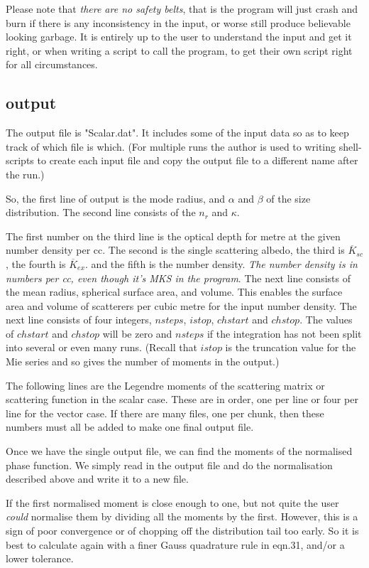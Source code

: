 \begin{flushleft}
Please note that {\it there are no safety belts}, that is the program will just
crash and burn if there is any inconsistency in the input, or worse still
 produce believable looking garbage. It is entirely up to the user to 
understand the input 
and get it right, or when writing a script to call the program, to get their own script
right for all circumstances.

\subsection{output}

The output file is "Scalar.dat". It includes some of the 
input data so as to keep track of which file is which. (For multiple
runs the author is used to writing shell-scripts to create each input file
and copy the output file to a different name after the run.)

So, the first line of output is the mode radius, and $\alpha$ and $\beta$ 
of the size distribution. The second line consists of the $n_r$ and $\kappa$.

The first number on the third line is the optical depth for metre at
the given number density per cc. The second is the single scattering albedo,
the third is ${\overline K_{sc}}$, the fourth is ${\overline K_{ex}}$.
and the fifth is the number density. {\it The number density is
 in numbers per cc, even though it's MKS in the program}.
The next line consists of the mean radius, spherical surface area, and volume.
This enables the surface area and volume of scatterers per cubic metre 
for the input number density.
The next line consists of four integers, $nsteps$, $istop$, $chstart$ and $chstop$.
The values of $chstart$ and $chstop$ will be zero and $nsteps$ if the integration
has not been split into several or even many runs. (Recall that $istop$ is the 
truncation value for the Mie series and so gives the number of moments in 
the output.)

The following lines are the Legendre moments of the scattering matrix
or scattering function in the scalar case.  These are in order, one per 
line or four per line for the vector case.
 If there are many files, one per chunk,
then these numbers must all be added to make one final output file.

Once we have the single output file, we can find the moments
of the normalised phase function. We simply read in the output file
and do the normalisation described above and write it to a new file.

If the first normalised moment is close enough to one, but not quite 
the user {\it could} normalise them by dividing all the moments by the first.
However, this is a sign of poor convergence or of chopping off the distribution
tail too early. So it is best to  calculate again with a finer Gauss quadrature 
rule in eqn.31, and/or a lower tolerance.


\end{flushleft}


